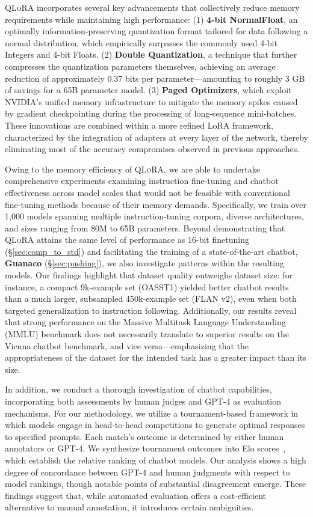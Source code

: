 \textsc{QLoRA} incorporates several key advancements that collectively reduce memory requirements while maintaining high performance: (1) \textbf{4-bit NormalFloat}, an optimally information-preserving quantization format tailored for data following a normal distribution, which empirically surpasses the commonly used 4-bit Integers and 4-bit Floats. (2) \textbf{Double Quantization}, a technique that further compresses the quantization parameters themselves, achieving an average reduction of approximately 0.37 bits per parameter—amounting to roughly 3 GB of savings for a 65B parameter model. (3) \textbf{Paged Optimizers}, which exploit NVIDIA’s unified memory infrastructure to mitigate the memory spikes caused by gradient checkpointing during the processing of long-sequence mini-batches. These innovations are combined within a more refined LoRA framework, characterized by the integration of adapters at every layer of the network, thereby eliminating most of the accuracy compromises observed in previous approaches.

Owing to the memory efficiency of \textsc{QLoRA}, we are able to undertake comprehensive experiments examining instruction fine-tuning and chatbot effectiveness across model scales that would not be feasible with conventional fine-tuning methods because of their memory demands. Specifically, we train over 1,000 models spanning multiple instruction-tuning corpora, diverse architectures, and sizes ranging from 80M to 65B parameters. Beyond demonstrating that \textsc{QLoRA} attains the same level of performance as 16-bit finetuning (\S\ref{sec:comp_to_std}) and facilitating the training of a state-of-the-art chatbot, \textbf{Guanaco} (\S\ref{sec:pushing}), we also investigate patterns within the resulting models. Our findings highlight that dataset quality outweighs dataset size: for instance, a compact 9k-example set (OASST1) yielded better chatbot results than a much larger, subsampled 450k-example set (FLAN v2), even when both targeted generalization to instruction following. Additionally, our results reveal that strong performance on the Massive Multitask Language Understanding (MMLU) benchmark does not necessarily translate to superior results on the Vicuna chatbot benchmark, and vice versa—emphasizing that the appropriateness of the dataset for the intended task has a greater impact than its size.

In addition, we conduct a thorough investigation of chatbot capabilities, incorporating both assessments by human judges and GPT-4 as evaluation mechanisms. For our methodology, we utilize a tournament-based framework in which models engage in head-to-head competitions to generate optimal responses to specified prompts. Each match’s outcome is determined by either human annotators or GPT-4. We synthesize tournament outcomes into Elo scores~\citep{elo1967proposed, elo1978rating}, which establish the relative ranking of chatbot models. Our analysis shows a high degree of concordance between GPT-4 and human judgments with respect to model rankings, though notable points of substantial disagreement emerge. These findings suggest that, while automated evaluation offers a cost-efficient alternative to manual annotation, it introduces certain ambiguities.

